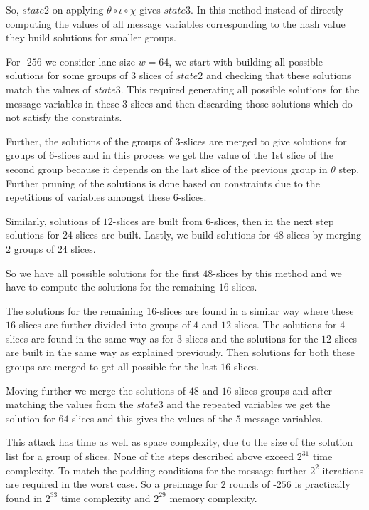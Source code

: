 So, $state2$ on applying $\theta \circ \iota \circ \chi$ gives $state3$. In this method instead of directly computing the values of all message variables corresponding to the hash value they build solutions for smaller groups. 

For \KECCAK-$256$ we consider lane size $w = 64$, we start with building all possible solutions for some groups of $3$ slices of $state2$ and checking that these solutions match the values of $state3$. This required generating all possible solutions for the message variables in these $3$ slices and then discarding those solutions which do not satisfy the constraints.

Further, the solutions of the groups of $3$-slices are merged to give solutions for groups of $6$-slices and in this process we get the value of the $1$st slice of the second group because it depends on the last slice of the previous group in $\theta$ step. Further pruning of the solutions is done based on constraints due to the repetitions of variables amongst these $6$-slices.

Similarly, solutions of $12$-slices are built from $6$-slices, then in the next step solutions for $24$-slices are built. Lastly, we build solutions for $48$-slices by merging $2$ groups of $24$ slices.
 
So we have all possible solutions for the first $48$-slices by this method and we have to compute the solutions for the remaining $16$-slices.

The solutions for the remaining $16$-slices are found in a similar way where these $16$ slices are further divided into groups of $4$ and $12$ slices. The solutions for $4$ slices are found in the same way as for $3$ slices and the solutions for the $12$ slices are built in the same way as explained previously. Then solutions for both these groups are merged to get all possible for the last $16$ slices.

Moving further we merge the solutions of $48$ and $16$ slices groups and after matching the values from the $state3$ and the repeated variables we get the solution for $64$ slices and this gives the values of the $5$ message variables.

This attack has time as well as space complexity, due to the size of the solution list for a group of slices. None of the steps described above exceed $2^{31}$ time complexity. To match the padding conditions for the message further $2^2$ iterations are required in the worst case. So a preimage for $2$ rounds of \KECCAK-$256$ is practically found in $2^{33}$ time complexity and $2^{29}$ memory complexity.

